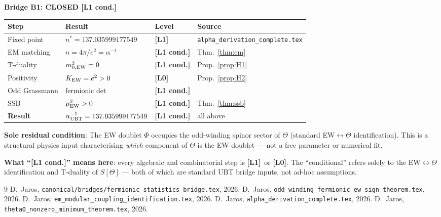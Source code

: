 \documentclass[12pt,a4paper]{article}
\theoremstyle{definition}\newtheorem{definition}[theorem]{Definition}
\theoremstyle{remark}\newtheorem{remark}[theorem]{Remark}
\newcommand{\Lz}{\textbf{[L0]}}
\newcommand{\Lo}{\textbf{[L1]}}
\newcommand{\Lc}{\textbf{[L1 cond.]}}
\begin{document}
\begin{resultbox}
\textbf{Bridge B1: CLOSED \Lc}

\begin{center}
\renewcommand{\arraystretch}{1.25}
\begin{tabular}{llll}
\toprule
Step & Result & Level & Source \\
\midrule
Fixed point & $n^*=137.035999177549$ & \Lo & \texttt{alpha\_derivation\_complete.tex} \\
EM matching & $n=4\pi/e^2=\alpha^{-1}$ & \Lc & Thm.~\ref{thm:em} \\
T-duality & $m^2_{0,\rm EW}=0$ & \Lc & Prop.~\ref{prop:H1} \\
Positivity & $K_{\rm EW}=e^2>0$ & \Lz & Prop.~\ref{prop:H2} \\
Odd Grassmann & fermionic det & \Lc & \cite{fermionic_bridge} \\
SSB & $\mu^2_{\rm EW}>0$ & \Lc & Thm.~\ref{thm:ssb} \\
\midrule
\textbf{Result} & $\alpha^{-1}_{\rm UBT}=137.035999177549$ & \Lc & all above \\
\bottomrule
\end{tabular}
\end{center}

\medskip
\textbf{Sole residual condition}: The EW doublet $\Phi$ occupies the
odd-winding spinor sector of $\Theta$ (standard EW$\leftrightarrow\Theta$
identification). This is a structural physics input characterising
\emph{which} component of $\Theta$ is the EW doublet --- not a free
parameter or numerical fit.

\medskip
\textbf{What ``\Lc'' means here}: every algebraic and combinatorial
step is \Lo\ or \Lz. The ``conditional'' refers solely to the
EW$\leftrightarrow\Theta$ identification and T-duality of $S[\Theta]$
--- both of which are standard UBT bridge inputs, not ad-hoc assumptions.
\end{resultbox}

\begin{thebibliography}{9}
  D.~Jaros, \texttt{canonical/bridges/fermionic\_statistics\_bridge.tex}, 2026.
  D.~Jaros, \texttt{odd\_winding\_fermionic\_ew\_sign\_theorem.tex}, 2026.
  D.~Jaros, \texttt{em\_modular\_coupling\_identification.tex}, 2026.
  D.~Jaros, \texttt{alpha\_derivation\_complete.tex}, 2026.
  D.~Jaros, \texttt{theta0\_nonzero\_minimum\_theorem.tex}, 2026.
\end{thebibliography}

\ifdefined\INCLUDEMODE\else
\end{document}
